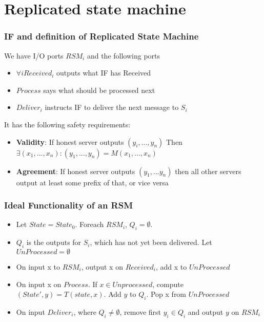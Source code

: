\documentclass[14pt]{beamer}
\begin{document}
\section{Replicated state machine}
        \begin{frame}
            \frametitle{IF and definition of Replicated State Machine}
                We have I/O ports $RSM_i$ and the following ports
                \begin{itemize}
                    \item $\forall i Received_i$ outputs what IF has Received
                    \item $Process$ says what should be processed next
                    \item $Deliver_i$ instructs IF to deliver the next message to $S_i$
                \end{itemize}
                It has the following safety requirements:
                    \begin{itemize}
                        \item \textbf{Validity}: If honest server outputs $(y_i, ..., y_n)$ Then $\exists (x_1, ..., x_n) : (y_1, ..., y_n) = M(x_1, ..., x_n)$
                        \item \textbf{Agreement}: If honest server outputs $(y_1, ... y_n)$ then all other servers output at least some prefix of that, or vice versa
                    \end{itemize}
        \end{frame}
    \begin{frame}
        \frametitle{Ideal Functionality of an RSM}
            \begin{itemize}
                \item Let $State = State_0$. Foreach $RSM_i$, $Q_i = \emptyset$. 
                \item $Q_i$ is the outputs for $S_i$, which has not yet been delivered. Let $UnProcessed = \emptyset$
                \item On input x to $RSM_i$, output x on $Received_i$, add x to $UnProcessed$
                \item On input x on $Process$. If $x \in Unprocessed$, compute $(State', y) = T(state, x)$. Add $y$ to $Q_i$. Pop x from $UnProcessed$
                \item On input $Deliver_i$, where $Q_i \neq \emptyset$, remove first $y_i \in Q_i$ and output $y$ on $RSM_i$
            \end{itemize}
    \end{frame}
\end{document}
